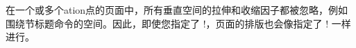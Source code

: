 % 
% 
在一个或多个\sync{}ation点的页面中，所有垂直空间的拉伸和收缩因子都被忽略，例如围绕节标题命令的空间。因此，即使您指定了 \!\flushbottom!，页面的排版也会像指定了 \!\raggedbottom! 一样进行。

% 
% 
% 



